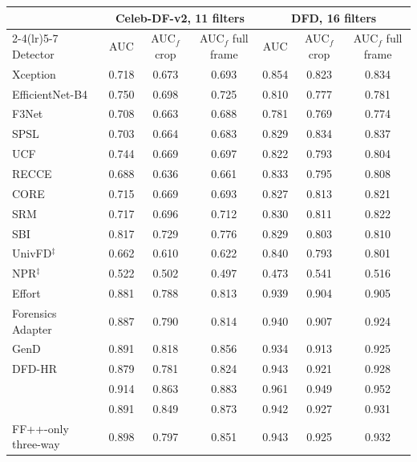 \begin{tabular}{@{}l ccc ccc@{}}
\toprule
 & \multicolumn{3}{c}{Celeb-DF-v2, 11 filters} & \multicolumn{3}{c}{DFD, 16 filters} \\
\cmidrule(lr){2-4}\cmidrule(lr){5-7}
Detector & AUC & AUC$_f$ crop & AUC$_f$ full frame & AUC & AUC$_f$ crop & AUC$_f$ full frame \\
\midrule
Xception~\cite{xception} & 0.718 & 0.673 & 0.693 & 0.854 & 0.823 & 0.834 \\
EfficientNet-B4~\cite{efficientnet} & 0.750 & 0.698 & 0.725 & 0.810 & 0.777 & 0.781 \\
F3Net~\cite{f3net} & 0.708 & 0.663 & 0.688 & 0.781 & 0.769 & 0.774 \\
SPSL~\cite{spsl} & 0.703 & 0.664 & 0.683 & 0.829 & 0.834 & 0.837 \\
UCF~\cite{ucf} & 0.744 & 0.669 & 0.697 & 0.822 & 0.793 & 0.804 \\
RECCE~\cite{recce} & 0.688 & 0.636 & 0.661 & 0.833 & 0.795 & 0.808 \\
CORE~\cite{core} & 0.715 & 0.669 & 0.693 & 0.827 & 0.813 & 0.821 \\
SRM~\cite{srm} & 0.717 & 0.696 & 0.712 & 0.830 & 0.811 & 0.822 \\
SBI~\cite{sbi} & 0.817 & 0.729 & 0.776 & 0.829 & 0.803 & 0.810 \\
UnivFD$^\ddagger$~\cite{univfd} & 0.662 & 0.610 & 0.622 & 0.840 & 0.793 & 0.801 \\
NPR$^\ddagger$~\cite{npr} & 0.522 & 0.502 & 0.497 & 0.473 & 0.541 & 0.516 \\
Effort~\cite{effort} & 0.881 & 0.788 & 0.813 & 0.939 & 0.904 & 0.905 \\
Forensics Adapter~\cite{forensicsadapter} & 0.887 & 0.790 & 0.814 & 0.940 & 0.907 & 0.924 \\
GenD~\cite{gend2026} & 0.891 & 0.818 & 0.856 & 0.934 & 0.913 & 0.925 \\
DFD-HR~\cite{dfdhr2026} & 0.879 & 0.781 & 0.824 & 0.943 & 0.921 & 0.928 \\
\oursB{} & 0.914 & 0.863 & 0.883 & 0.961 & 0.949 & 0.952 \\
\oursF{} & 0.891 & 0.849 & 0.873 & 0.942 & 0.927 & 0.931 \\
FF++-only three-way & 0.898 & 0.797 & 0.851 & 0.943 & 0.925 & 0.932 \\
\bottomrule
\end{tabular}

